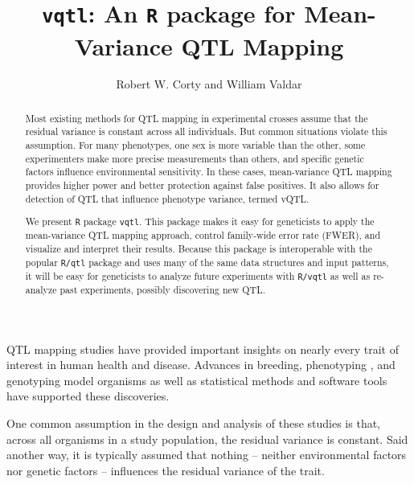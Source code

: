 \documentclass{article}
\title{\texttt{vqtl}: An \texttt{R} package for Mean-Variance QTL Mapping}
\author{Robert W. Corty and William Valdar}
\begin{document}
\maketitle


\begin{abstract}
Most existing methods for QTL mapping in experimental crosses assume that the residual variance is constant across all individuals.
But common situations violate this assumption.
For many phenotypes, one sex is more variable than the other, some experimenters make more precise measurements than others, and specific genetic factors influence environmental sensitivity.
In these cases, mean-variance QTL mapping provides higher power and better protection against false positives.
It also allows for detection of QTL that influence phenotype variance, termed vQTL.

We present \texttt{R} package \texttt{vqtl}.
This package makes it easy for geneticists to apply the mean-variance QTL mapping approach, control family-wide error rate (FWER), and visualize and interpret their results.
Because this package is interoperable with the popular \texttt{R/qtl} package and uses many of the same data structures and input patterns, it will be easy for geneticists to analyze future experiments with \texttt{R/vqtl} as well as re-analyze past experiments, possibly discovering new QTL.
\end{abstract}



\noindent QTL mapping studies have provided important insights on nearly every trait of interest in human health and disease.
Advances in breeding, phenotyping \citep{Yang2014a}, and genotyping \citep{Williams1990} model organisms as well as statistical methods \citep{Lander1989a} and software tools \citep{Broman2003} have supported these discoveries.

One common assumption in the design and analysis of these studies is that, across all organisms in a study population, the residual variance is constant.
Said another way, it is typically assumed that nothing -- neither environmental factors nor genetic factors -- influences the residual variance of the trait.

\end{document}
